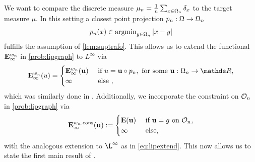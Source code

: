 %
%
We want to compare the discrete measure $\mu_n = \frac{1}{n}\sum_{x\in\Omega_n} \delta_x$ to the target measure $\mu$. In this setting a closest point projection $p_n:\Omega\to\Omega_n$
%
\begin{align*}
p_n(x) \in \operatorname{argmin}_{y\in\Omega_n} \left|x- y\right|
\end{align*}
%
fulfills the assumption of \cref{lem:suptrafo}. This allows us to extend the functional $\mathbf{E}^{w_n}_\infty$ in \cref{prob:lipgraph} to $L^\infty$ via
%
\begin{align}\label{eq:lipextend}
\GE^{w_n}_\infty(u) = 
%
\begin{cases}
\GE^{w_n}_\infty(\vec u) &\text{ if } u=\vec u \circ p_n,\text{ for some } \vec u :\domain_n\to\R,\\
\infty &\text{ else },
\end{cases}
\end{align}
%
which was similarly done in \cite{GarcSlep15, slepcev2019analysis}. Additionally, we incorporate the constraint on $\mathcal{O}_n$ in \cref{prob:lipgraph} via
%
\begin{align*}
\mathbf{E}^{w_n, \text{cons}}_\infty (\mathbf{u}):=
\begin{cases}
\mathbf{E}(\mathbf{u})&\text{ if } \mathbf{u} = g \text{ on } \mathcal{O}_n,\\
\infty &\text{ else},
\end{cases}
\end{align*}
%
with the analogous extension to $\L^\infty$ as in \cref{eq:lipextend}.
%
This now allows us to state the first main result of \cite{roith2022continuum}.

